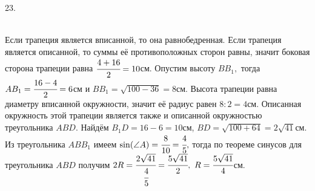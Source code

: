 23. \begin{figure}[ht!]
\end{figure}\\
Если трапеция является вписанной, то она равнобедренная. Если трапеция является описанной, то суммы её противоположных сторон равны, значит боковая сторона трапеции равна $\cfrac{4+16}{2}=10$см. Опустим высоту $BB_1,$ тогда $AB_1=\cfrac{16-4}{2}=6$см и $BB_1=\sqrt{100-36}=8$см. Высота трапеции равна диаметру вписанной окружности, значит её радиус равен $8:2=4$см. Описанная окружность этой трапеции является также и описанной окружностью треугольника $ABD.$ Найдём $B_1D=16-6=10$см, $BD=\sqrt{100+64}=2\sqrt{41}$см. Из треугольника $ABB_1$ имеем $\sin(\angle A)=\cfrac{8}{10}=\cfrac{4}{5},$ тогда по теореме синусов для треугольника $ABD$ получим $2R=\cfrac{2\sqrt{41}}{\cfrac{4}{5}}=\cfrac{5\sqrt{41}}{2},\ R=\cfrac{5\sqrt{41}}{4}$см.\\
